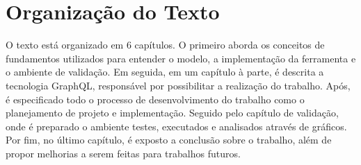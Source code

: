 \section[Organização do Texto]{Organização do Texto}

O texto está organizado em 6 capítulos. O primeiro aborda os conceitos de fundamentos utilizados para entender o modelo, a implementação da ferramenta e o ambiente de validação. Em seguida, em um capítulo à parte, é descrita a tecnologia GraphQL, responsável por possibilitar a realização do trabalho. Após, é especificado todo o processo de desenvolvimento do trabalho como o planejamento de projeto e implementação. Seguido pelo capítulo de validação, onde é preparado o ambiente testes, executados e analisados através de gráficos. Por fim, no último capítulo, é exposto a conclusão sobre o trabalho, além de propor melhorias a serem feitas para trabalhos futuros.
